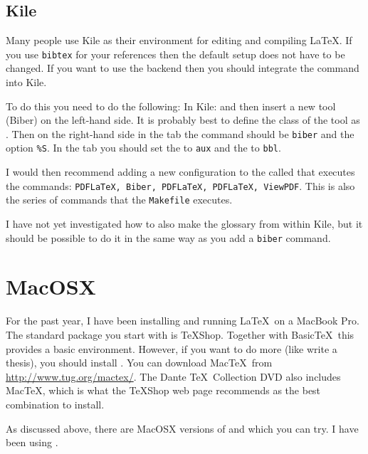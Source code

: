 \subsection{Kile}
\label{sec:app:kubuntu:kile}

Many people use Kile as their environment for editing and compiling
\LaTeX. If you use \texttt{bibtex} for your references then the default
setup does not have to be changed. If you want to use the
 backend then you should integrate the
command into Kile.

To do this you need to do the following:
In Kile:  and
then insert a new tool (Biber) on the left-hand side. It is probably
best to define the class of the tool as \BibTeX. Then on the
right-hand side in the  tab the command should be
\texttt{biber} and the option \texttt{\%S}. In the 
tab you should set the  to \texttt{aux} and
the  to \texttt{bbl}.

I would then recommend adding a new configuration to the
 called  that
executes the commands: \texttt{PDFLaTeX, Biber, PDFLaTeX, PDFLaTeX,
  ViewPDF}. This is also the series of commands that the
\texttt{Makefile} executes.

I have not yet investigated how to also make the glossary from within
Kile, but it should be possible to do it in the same way as you add a
\texttt{biber} command.


\section{MacOSX}
\label{sec:app:mac}

For the past year, I have been installing and running \LaTeX\ on a MacBook Pro.
The standard package you start with is \TeX Shop. 
Together with Basic\TeX\ this provides a basic environment. 
However, if you want to do more (like write a thesis),
you should install \TeXLive.
You can download Mac\TeX\ from \url{http://www.tug.org/mactex/}.
The Dante \TeX\ Collection DVD also includes Mac\TeX, which is what the \TeX Shop web page
recommends as the best combination to install.

As discussed above, there are MacOSX versions of \TeXstudio and \TeXmaker which you can try.
I have been using \TeXstudio.


